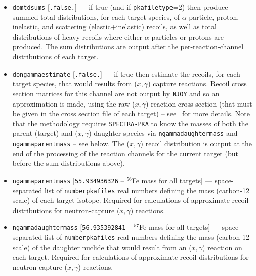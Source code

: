 \documentclass[a4paper]{article}
\begin{document}
\begin{itemize}
\item \texttt{do{\textunderscore}mtd{\textunderscore}sums} [\texttt{.false.}] --- if true (and if \texttt{pka{\textunderscore}filetype}=2) then produce summed total distributions, for each target species, of \(\alpha\)-particle, proton, inelastic, and scattering (elastic+inelastic) recoils, as well as total distributions of heavy recoils where either \(\alpha\)-particles or protons are produced. The sum distributions are output after the per-reaction-channel distributions of each target.
\item \texttt{do{\textunderscore}ngamma{\textunderscore}estimate} [\texttt{.false.}]  --- if true then estimate the recoils, for each target species, that would results from (\(x,\gamma\)) capture reactions. Recoil cross section matrices for this channel are not output by \texttt{NJOY} and so an approximation is made, using the raw (\(x,\gamma\)) reaction cross section (that must be given in the cross section file of each target) -- see~\cite{gilbertmariansublet2015} for more details. Note that the methodology requires \texttt{SPECTRA-PKA} to know the masses of both the parent (target) and (\(x,\gamma\)) daughter species via \texttt{ngamma{\textunderscore}daughter{\textunderscore}mass} and  \texttt{ngamma{\textunderscore}parent{\textunderscore}mass} -- see below. The (\(x,\gamma\)) recoil distribution is output at the end of the processing of the reaction channels for the current target (but before the sum distributions above).
\item \texttt{ngamma{\textunderscore}parent{\textunderscore}mass} [\texttt{55.934936326} -- \(^{56}\)Fe mass for all targets] --- space-separated list of \texttt{number{\textunderscore}pka{\textunderscore}files} real numbers defining the mass (carbon-12 scale) of each target isotope. Required for calculations of approximate recoil distributions for neutron-capture (\(x,\gamma\)) reactions.
\item \texttt{ngamma{\textunderscore}daughter{\textunderscore}mass} [\texttt{56.935392841} -- \(^{57}\)Fe mass for all targets] --- space-separated list of \texttt{number{\textunderscore}pka{\textunderscore}files} real numbers defining the mass (carbon-12 scale) of the daughter nuclide that would result from an (\(x,\gamma\)) reaction on each target. Required for calculations of approximate recoil distributions for neutron-capture (\(x,\gamma\)) reactions.


\end{itemize}
\end{document}
